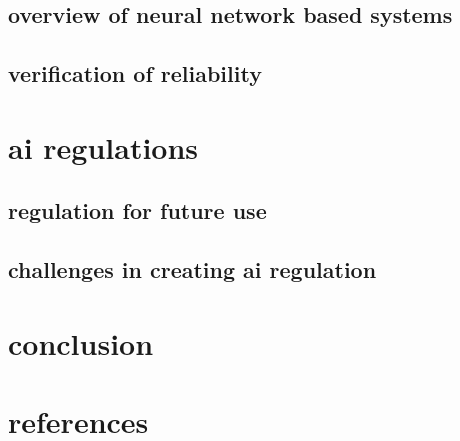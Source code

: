 \documentclass[letterpaper,11pt]{reportOutline} %
\begin{document}
\subsection{overview of neural network based systems}
\subsection{verification of reliability}

\section{ai regulations}
\subsection{regulation for future use}
\subsection{challenges in creating ai regulation}

\section{conclusion}

\section*{references}
	
\end{document}
